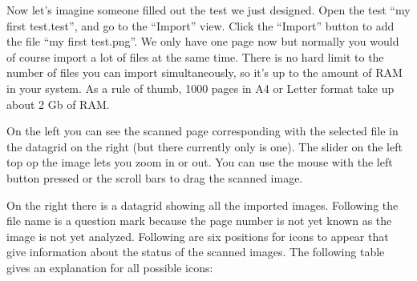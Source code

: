 \documentclass[10pt,a4paper]{article}
\begin{document}
Now let's imagine someone filled out the test we just designed. Open the test ``my first test.test'', and go to the ``Import'' view. Click the ``Import'' button to add the file ``my first test.png''. We only have one page now but normally you would of course import a lot of files at the same time. There is no hard limit to the number of files you can import simultaneously, so it's up to the amount of RAM in your system. As a rule of thumb, 1000 pages in A4 or Letter format take up about 2 Gb of RAM.

On the left you can see the scanned page corresponding with the selected file in the datagrid on the right (but there currently only is one). The slider on the left top op the image lets you zoom in or out. You can use the mouse with the left button pressed or the scroll bars to drag the scanned image. 

On the right there is a datagrid showing all the imported images. Following the file name is a question mark because the page number is not yet known as the image is not yet analyzed. Following are six positions for icons to appear that give information about the status of the scanned images. The following table gives an explanation for all possible icons:\\
\end{document}
